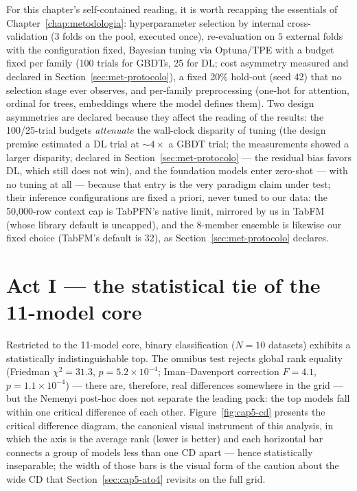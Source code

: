 For this chapter's self-contained reading, it is worth recapping the
essentials of Chapter~\ref{chap:metodologia}: hyperparameter
selection by internal cross-validation ($3$ folds on the pool,
executed once), re-evaluation on $5$ external folds with the
configuration fixed, Bayesian tuning via Optuna/TPE \citep{akiba2019}
with a budget fixed per family (100 trials for GBDTs, 25 for DL; cost
asymmetry measured and declared in
Section~\ref{sec:met-protocolo}), a fixed 20\% hold-out (seed 42)
that no selection stage ever observes, and per-family preprocessing
(one-hot for attention, ordinal for trees, embeddings where the model
defines them). Two design asymmetries are declared because they
affect the reading of the results: the 100/25-trial budgets
\emph{attenuate} the wall-clock disparity of tuning (the design
premise estimated a DL trial at ${\sim}4\times$ a GBDT trial; the
measurements showed a larger disparity, declared in
Section~\ref{sec:met-protocolo} --- the residual bias favors DL,
which still does not win), and the foundation models enter zero-shot
--- with no tuning at all --- because that entry is the very paradigm
claim under test; their inference configurations are fixed a priori,
never tuned to our data: the 50{,}000-row context cap is TabPFN's
native limit, mirrored by us in TabFM (whose library default is
uncapped), and the 8-member ensemble is likewise our fixed choice
(TabFM's default is 32), as Section~\ref{sec:met-protocolo} declares.

\section{Act I --- the statistical tie of the 11-model core}
\label{sec:cap5-ato1}

Restricted to the 11-model core, binary classification ($N{=}10$
datasets) exhibits a statistically indistinguishable top. The omnibus
test rejects global rank equality (Friedman $\chi^2 = 31.3$,
$p = 5.2\times10^{-4}$; Iman--Davenport correction $F = 4.1$,
$p = 1.1\times10^{-4}$) --- there are, therefore, real differences
somewhere in the grid --- but the Nemenyi post-hoc \citep{demsar2006}
does not separate the leading pack: the top models fall within one
critical difference of each other. Figure~\ref{fig:cap5-cd} presents
the critical difference diagram, the canonical visual instrument of
this analysis, in which the axis is the average rank (lower is
better) and each horizontal bar connects a group of models less than
one CD apart --- hence statistically inseparable; the width of those
bars is the visual form of the caution about the wide CD that
Section~\ref{sec:cap5-ato4} revisits on the full grid.

